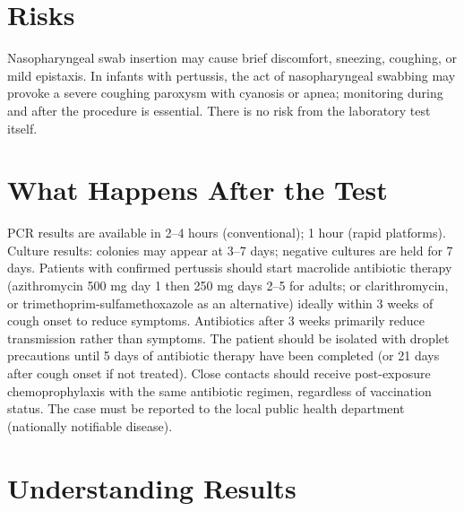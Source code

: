 \section*{Risks}
Nasopharyngeal swab insertion may cause brief discomfort, sneezing, coughing, or mild epistaxis. In infants with pertussis, the act of nasopharyngeal swabbing may provoke a severe coughing paroxysm with cyanosis or apnea; monitoring during and after the procedure is essential. There is no risk from the laboratory test itself.

\section*{What Happens After the Test}
PCR results are available in 2--4 hours (conventional); 1 hour (rapid platforms). Culture results: colonies may appear at 3--7 days; negative cultures are held for 7 days. Patients with confirmed pertussis should start macrolide antibiotic therapy (azithromycin 500 mg day 1 then 250 mg days 2--5 for adults; or clarithromycin, or trimethoprim-sulfamethoxazole as an alternative) ideally within 3 weeks of cough onset to reduce symptoms. Antibiotics after 3 weeks primarily reduce transmission rather than symptoms. The patient should be isolated with droplet precautions until 5 days of antibiotic therapy have been completed (or 21 days after cough onset if not treated). Close contacts should receive post-exposure chemoprophylaxis with the same antibiotic regimen, regardless of vaccination status. The case must be reported to the local public health department (nationally notifiable disease).

\section*{Understanding Results}

